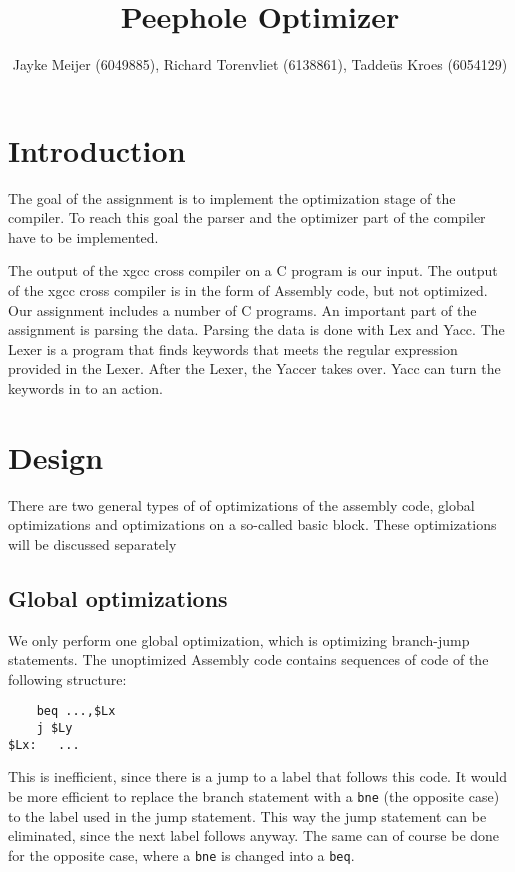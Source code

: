 \documentclass[10pt,a4paper]{article}
\title{Peephole Optimizer}
\author{Jayke Meijer (6049885), Richard Torenvliet (6138861), Tadde\"us Kroes
    (6054129)}
\begin{document}
\maketitle
\tableofcontents
\pagebreak

\section{Introduction}

The goal of the assignment is to implement the optimization stage of the
compiler. To reach this goal the parser and the optimizer part of the compiler
have to be implemented.

The output of the xgcc cross compiler on a C program is our input. The output
of the xgcc cross compiler is in the form of Assembly code, but not optimized.
Our assignment includes a number of C programs. An important part of the
assignment is parsing the data. Parsing the data is done with Lex and Yacc. The
Lexer is a program that finds keywords that meets the regular expression
provided in the Lexer. After the Lexer, the Yaccer takes over. Yacc can turn
the keywords in to an action.

\section{Design}

There are two general types of of optimizations of the assembly code, global
optimizations and optimizations on a so-called basic block. These optimizations
will be discussed separately

\subsection{Global optimizations}

We only perform one global optimization, which is optimizing branch-jump
statements. The unoptimized Assembly code contains sequences of code of the
following structure:
\begin{verbatim}
    beq ...,$Lx
    j $Ly
$Lx:   ...
\end{verbatim}
This is inefficient, since there is a jump to a label that follows this code.
It would be more efficient to replace the branch statement with a \texttt{bne}
(the opposite case) to the label used in the jump statement. This way the jump
statement can be eliminated, since the next label follows anyway. The same can
of course be done for the opposite case, where a \texttt{bne} is changed into a
\texttt{beq}.
\end{document}
